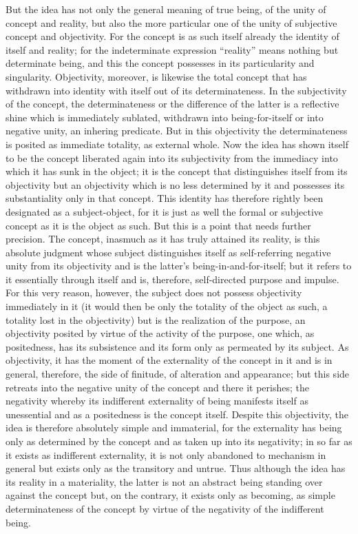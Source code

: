 But the idea has not only
the general meaning of true being,
of the unity of concept and reality,
but also the more particular one
of the unity of subjective concept and objectivity.
For the concept is as such itself
already the identity of itself and reality;
for the indeterminate expression “reality”
means nothing but determinate being,
and this the concept possesses
in its particularity and singularity.
Objectivity, moreover, is likewise the total concept
that has withdrawn into identity with itself out of its determinateness.
In the subjectivity of the concept,
the determinateness
or the difference of the latter is
a reflective shine which is immediately sublated,
withdrawn into being-for-itself
or into negative unity,
an inhering predicate.
But in this objectivity the determinateness is
posited as immediate totality, as external whole.
Now the idea has shown itself to be the concept
liberated again into its subjectivity
from the immediacy into which it has sunk in the object;
it is the concept that distinguishes itself from its objectivity
but an objectivity which is no less determined by it
and possesses its substantiality only in that concept.
This identity has therefore rightly been
designated as a subject-object,
for it is just as well the formal
or subjective concept
as it is the object as such.
But this is a point that needs further precision.
The concept, inasmuch as it has truly attained its reality,
is this absolute judgment whose subject distinguishes itself
as self-referring negative unity from its objectivity
and is the latter's being-in-and-for-itself;
but it refers to it essentially through itself
and is, therefore, self-directed purpose and impulse.
For this very reason, however,
the subject does not possess objectivity immediately in it
(it would then be only the totality of the object as such,
a totality lost in the objectivity)
but is the realization of the purpose,
an objectivity posited by virtue of
the activity of the purpose,
one which, as positedness, has its subsistence and its form only as
permeated by its subject.
As objectivity, it has the moment of the externality
of the concept in it and is in general,
therefore, the side of finitude,
of alteration and appearance;
but this side retreats into the negative unity of
the concept and there it perishes;
the negativity whereby its indifferent
externality of being manifests itself as unessential
and as a positedness is the concept itself.
Despite this objectivity, the idea is therefore
absolutely simple and immaterial,
for the externality has being only
as determined by the concept
and as taken up into its negativity;
in so far as it exists as indifferent externality,
it is not only abandoned to mechanism in general
but exists only as the transitory and untrue.
Thus although the idea
has its reality in a materiality,
the latter is not an abstract being standing
over against the concept
but, on the contrary, it exists only as becoming,
as simple determinateness of the concept
by virtue of the negativity of the indifferent being.

